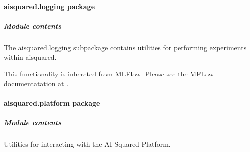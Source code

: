 \documentclass[letterpaper,10pt,english]{sphinxmanual}
\begin{document}
\begin{fulllineitems}

\begin{fulllineitems}
\label{\detokenize{aisquared.config:aisquared.config.ModelConfiguration.ModelConfiguration.version}}
\pysigstartsignatures
{}
\pysigstopsignatures
\end{fulllineitems}


\end{fulllineitems}


\sphinxstepscope


\paragraph{aisquared.logging package}
\label{\detokenize{aisquared.logging:aisquared-logging-package}}\label{\detokenize{aisquared.logging::doc}}

\subparagraph{Module contents}
\label{\detokenize{aisquared.logging:module-aisquared.logging}}\label{\detokenize{aisquared.logging:module-contents}}
\sphinxAtStartPar
The aisquared.logging subpackage contains utilities for performing experiments within aisquared.

\sphinxAtStartPar
This functionality is inhereted from MLFlow. Please see the MFLow documentatation at .

\sphinxstepscope


\paragraph{aisquared.platform package}
\label{\detokenize{aisquared.platform:aisquared-platform-package}}\label{\detokenize{aisquared.platform::doc}}

\subparagraph{Module contents}
\label{\detokenize{aisquared.platform:module-aisquared.platform}}\label{\detokenize{aisquared.platform:module-contents}}
\sphinxAtStartPar
Utilities for interacting with the AI Squared Platform.
\end{document}
